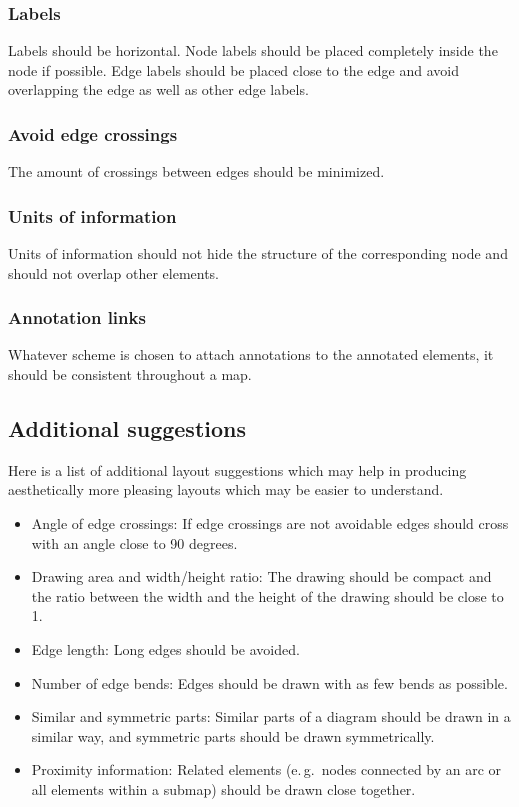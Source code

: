 \subsubsection{Labels}

Labels should be horizontal. Node labels should be placed completely inside the node if possible. Edge labels should be placed close to the edge and avoid overlapping the edge as well as other edge labels.

\subsubsection{Avoid edge crossings}

The amount of crossings between edges should be minimized.

\subsubsection{Units of information}

Units of information should not hide the structure of the corresponding node and should not overlap other elements.

\subsubsection{Annotation links}

Whatever scheme is chosen to attach annotations to the annotated elements, it should be consistent throughout a map.

\subsection{Additional suggestions}

Here is a list of additional layout suggestions which may help in producing aesthetically more pleasing layouts which may be easier to understand.

\begin{itemize}
  \item Angle of edge crossings: If edge crossings are not avoidable edges should cross with an angle close to 90 degrees.
  \item Drawing area and width/height ratio: The drawing should be compact and the ratio between the width and the height of the drawing should be close to 1.
  \item Edge length: Long edges should be avoided.
  \item Number of edge bends: Edges should be drawn with as few bends as possible.
  \item Similar and symmetric parts: Similar parts of a diagram should be drawn in a similar way, and symmetric parts should be drawn symmetrically.
  \item Proximity information: Related elements (e.\,g.~nodes connected by an arc or all elements within a submap) should be drawn close together.
\end{itemize} 

\normalcolor